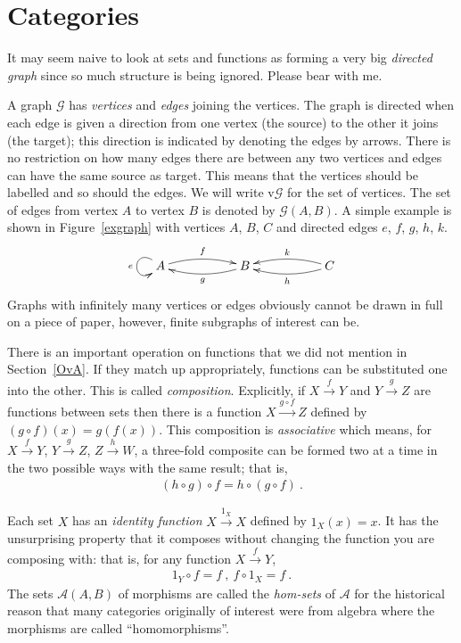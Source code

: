 \documentclass[a4paper,12pt]{article}
\theoremstyle{step}
\newcommand{\xra}{\xrightarrow}
\def\CA{{\mathscr A}}
\def\CG{{\mathscr G}}
\begin{document}
\section{Categories}

It may seem naive to look at sets and functions as forming a very big {\em directed graph} since
so much structure is being ignored. Please bear with me.

A graph $\CG$ has {\em vertices} and {\em edges} joining
the vertices. The graph is directed when each edge is given a direction from one vertex 
(the source) to the other it joins (the target); this direction is indicated by denoting the edges by arrows. 
There is no restriction on how many edges there are between any two vertices and edges can have
the same source as target. This means that the vertices should be labelled and so should the edges.
We will write  $\mathrm{v}\CG$ for the set of vertices. The set of edges from vertex $A$ to vertex $B$ is denoted by $\CG(A,B)$.
A simple example is shown in Figure~\eqref{exgraph} with vertices $A$, $B$, $C$ and directed edges
$e$, $f$, $g$, $h$, $k$.
\begin{eqnarray}\label{exgraph}
\begin{aligned}
\xymatrix{
A \ar@(ul,dl) [] _ {e} \ar@/^/[rr] ^ f
&& B \ar@/^/[ll] ^ {g}
&& C \ar@/^/[ll] ^ {h} \ar@/_/[ll] _ {k}
}
\end{aligned}
\end{eqnarray}
Graphs with infinitely many vertices or edges obviously cannot be drawn in full on a piece of paper,
however, finite subgraphs of interest can be.

There is an important operation on functions that we did not mention in Section~\ref{OvA}.
If they match up appropriately, functions can be substituted one into the other. 
This is called {\em composition}. Explicitly, if $X\xra{f}Y$ and $Y\xra{g}Z$ are functions between
sets then there is a function $X\xra{g\circ f}Z$ defined by $(g\circ f)(x) = g(f(x))$.
This composition is {\em associative} which means, for $X\xra{f}Y$, $Y\xra{g}Z$, $Z\xra{h}W$,
a three-fold composite can be formed two at a time in the two possible ways with the same result;
that is, 
\begin{eqnarray}\label{assoc}
(h\circ g)\circ f = h\circ (g\circ f) \ .
\end{eqnarray} 

Each set $X$ has an {\em identity function} $X\xra{1_X}X$ defined by $1_X(x) = x$. 
It has the unsurprising property that it composes without changing the function you are 
composing with: that is, for any function $X\xra{f}Y$, 
\begin{eqnarray}\label{ident}
1_Y\circ f = f \ , \ f\circ 1_X = f  \ .
\end{eqnarray} 
The sets $\CA(A,B)$ of morphisms are called the {\em hom-sets} of $\CA$ for the historical 
reason that many categories originally of interest were from algebra where the morphisms 
are called ``homomorphisms''. 
\end{document}
